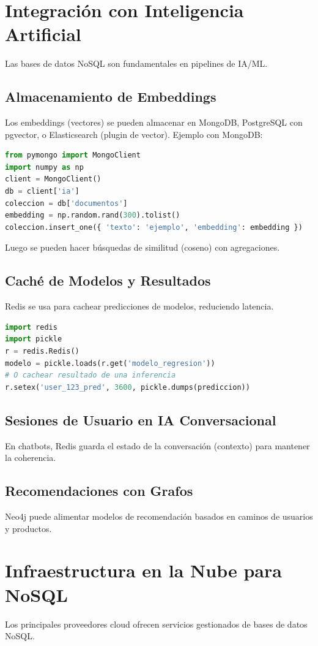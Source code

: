 \documentclass[12pt,a4paper,openany,oneside]{book}
\begin{document}
\chapter{Integración con Inteligencia Artificial}
Las bases de datos NoSQL son fundamentales en pipelines de IA/ML.

\section{Almacenamiento de Embeddings}
Los embeddings (vectores) se pueden almacenar en MongoDB, PostgreSQL con pgvector, o Elasticsearch (plugin de vector). Ejemplo con MongoDB:
\begin{lstlisting}[language=Python]
from pymongo import MongoClient
import numpy as np
client = MongoClient()
db = client['ia']
coleccion = db['documentos']
embedding = np.random.rand(300).tolist()
coleccion.insert_one({ 'texto': 'ejemplo', 'embedding': embedding })
\end{lstlisting}
Luego se pueden hacer búsquedas de similitud (coseno) con agregaciones.

\section{Caché de Modelos y Resultados}
Redis se usa para cachear predicciones de modelos, reduciendo latencia.
\begin{lstlisting}[language=Python]
import redis
import pickle
r = redis.Redis()
modelo = pickle.loads(r.get('modelo_regresion'))
# O cachear resultado de una inferencia
r.setex('user_123_pred', 3600, pickle.dumps(prediccion))
\end{lstlisting}

\section{Sesiones de Usuario en IA Conversacional}
En chatbots, Redis guarda el estado de la conversación (contexto) para mantener la coherencia.

\section{Recomendaciones con Grafos}
Neo4j puede alimentar modelos de recomendación basados en caminos de usuarios y productos.

\chapter{Infraestructura en la Nube para NoSQL}
Los principales proveedores cloud ofrecen servicios gestionados de bases de datos NoSQL.
\end{document}
